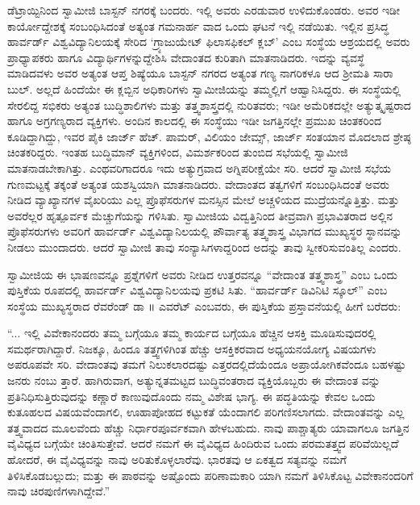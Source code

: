 ಡೆಟ್ರಾಯ್ಟಿನಿಂದ ಸ್ವಾಮೀಜಿ ಬಾಸ್ಟನ್ ನಗರಕ್ಕೆ ಬಂದರು. ಇಲ್ಲಿ ಅವರು ಎರಡುವಾರ ಉಳಿದುಕೊಂಡರು. ಅವರ ಇಡೀ ಕಾರ್ಯೋದ್ದೇಶಕ್ಕೆ ಸಂಬಂಧಿಸಿದಂತೆ ಅತ್ಯಂತ ಗಮನಾರ್ಹ ವಾದ ಒಂದು ಘಟನೆ ಇಲ್ಲಿ ನಡೆಯಿತು. ಇಲ್ಲಿನ ಪ್ರಸಿದ್ಧ ಹಾರ್ವರ್ಡ್ ವಿಶ್ವವಿದ್ಯಾನಿಲಯಕ್ಕೆ ಸೇರಿದ ‘ಗ್ರ್ಯಾಜುಯೇಟ್ ಫಿಲಾಸಫಿಕಲ್ ಕ್ಲಬ್​’ ಎಂಬ ಸಂಸ್ಥೆಯ ಆಶ್ರಯದಲ್ಲಿ ಅವರು ಪ್ರಾಧ್ಯಾಪಕರು ಹಾಗೂ ವಿದ್ಯಾರ್ಥಿಗಳನ್ನುದ್ದೇಶಿಸಿ ವೇದಾಂತದ ಕುರಿತಾಗಿ ಮಾತನಾಡಿದರು. ಇದನ್ನು ವ್ಯವಸ್ಥೆ ಮಾಡಿದವಳು ಅವರ ಅತ್ಯಂತ ಆಪ್ತ ಶಿಷ್ಯೆಯೂ ಬಾಸ್ಟನ್ ನಗರದ ಅತ್ಯಂತ ಗಣ್ಯ ನಾಗರಿಕಳೂ ಆದ ಶ್ರೀಮತಿ ಸಾರಾ ಬುಲ್. ಅಲ್ಲದೆ ಹಿಂದೆಯೇ ಈ ಕ್ಲಬ್ಬಿನ ಅಧಿಕಾರಿಗಳು ಸ್ವಾಮೀಜಿಯನ್ನು ತಮ್ಮಲ್ಲಿಗೆ ಆಹ್ವಾನಿಸಿದ್ದರು. ಈ ಸಂಸ್ಥೆಯಲ್ಲಿ ಸೇರಲಿದ್ದ ಸಭಿಕರು ಅತ್ಯಂತ ಬುದ್ಧಿಶಾಲಿಗಳು ಮತ್ತು ತತ್ತ್ವಶಾಸ್ತ್ರದಲ್ಲಿ ನುರಿತವರು; ಇಡೀ ಅಮೆರಿಕದಲ್ಲೇ ಅತ್ಯುತ್ಕೃಷ್ಟರಾದ ಹಾಗೂ ಅಗ್ರಗಣ್ಯರಾದ ವ್ಯಕ್ತಿಗಳು. ಅಂದಿನ ಕಾಲದಲ್ಲಿ ಈ ಸಂಸ್ಥೆಯು ಇಡೀ ಜಗತ್ತಿನಲ್ಲೇ ಪ್ರಮುಖ ಚಿಂತಕರಿಂದ ಕೂಡಿದ್ದಾಗಿದ್ದು, ಇವರ ಪೈಕಿ ಜಾರ್ಜ್ ಹೆಚ್. ಪಾಮರ್, ವಿಲಿಯಂ ಜೇಮ್ಸ್, ಜಾರ್ಜ್ ಸಂತಯಾನ ಮೊದಲಾದ ಶ್ರೇಷ್ಠ ಚಿಂತಕರಿದ್ದರು. ಇಂತಹ ಬುದ್ಧಿಮಾನ್ ವ್ಯಕ್ತಿಗಳಿಂದ, ವಿಮರ್ಶಕರಿಂದ ತುಂಬಿದ ಸಭೆಯಲ್ಲಿ ಸ್ವಾಮೀಜಿ ಮಾತನಾಡಬೇಕಾಗಿತ್ತು. ಎಂಥವರಿಗಾದರೂ ಇದು ಅತ್ಯುಗ್ರವಾದ ಅಗ್ನಿಪರೀಕ್ಷೆಯೇ ಸರಿ. ಆದರೆ ಸ್ವಾಮೀಜಿ ಸಭೆಯ ಗುಣಮಟ್ಟಕ್ಕೆ ತಕ್ಕಂತೆ ಅತ್ಯಂತ ಯಶಸ್ವಿಯಾಗಿ ಮಾತನಾಡಿದರು. ವೇದಾಂತದ ತತ್ವಗಳಿಗೆ ಸಂಬಂಧಿಸಿದಂತೆ ಅವರು ನೀಡಿದ ವ್ಯಾಖ್ಯಾನಗಳ ವೈಖರಿಯು ಎಲ್ಲ ಪ್ರೊಫೆಸರುಗಳ ಮನಸ್ಸಿನ ಮೇಲೆ ಅಚ್ಚಳಿಯದ ಮುದ್ರೆಯನ್ನೊತ್ತಿತ್ತು. ಮತ್ತು ಅವರೆಲ್ಲರ ಹೃತ್ಪೂರ್ವಕ ಮೆಚ್ಚುಗೆಯನ್ನು ಗಳಿಸಿತು. ಸ್ವಾಮೀಜಿಯ ವಿದ್ವತ್ತಿನಿಂದ ತೀವ್ರವಾಗಿ ಪ್ರಭಾವಿತರಾದ ಅಲ್ಲಿನ ಪ್ರೊಫೆಸರುಗಳು ಅವರಿಗೆ ಹಾರ್ವರ್ಡ್ ವಿಶ್ವವಿದ್ಯಾನಿಲಯಲ್ಲಿ ಪೌರ್ವಾತ್ಯ ತತ್ತ್ವಶಾಸ್ತ್ರ ವಿಭಾಗದ ಮುಖ್ಯಸ್ಥರ ಸ್ಥಾನವನ್ನು ನೀಡಲು ಮುಂದಾದರು. ಆದರೆ ಸ್ವಾಮೀಜಿ ತಾವು ಸಂನ್ಯಾಸಿಗಳಾದ್ದರಿಂದ ಅದನ್ನು ತಾವು ಸ್ವೀಕರಿಸುವಂತಿಲ್ಲ ಎಂದರು.

ಸ್ವಾಮೀಜಿಯ ಈ ಭಾಷಣವನ್ನೂ ಪ್ರಶ್ನೆಗಳಿಗೆ ಅವರು ನೀಡಿದ ಉತ್ತರವನ್ನೂ “ವೇದಾಂತ ತತ್ತ್ವಶಾಸ್ತ್ರ” ಎಂಬ ಒಂದು ಪುಸ್ತಿಕೆಯ ರೂಪದಲ್ಲಿ ಹಾರ್ವರ್ಡ್ ವಿಶ್ವವಿದ್ಯಾನಿಲಯವು ಪ್ರಕಟಿ ಸಿತು. “ಹಾರ್ವರ್ಡ್ ಡಿವಿನಿಟಿ ಸ್ಕೂಲ್​” ಎಂಬ ಸಂಸ್ಥೆಯ ಮುಖ್ಯಸ್ಥರಾದ ರೆವರೆಂಡ್ ಡಾ ॥ ಎವರೆಟ್ ಎಂಬವರು, ಈ ಪುಸ್ತಿಕೆಯ ಪ್ರಸ್ತಾವನೆಯಲ್ಲಿ ಹೀಗೆ ಬರೆದರು:

“... ಇಲ್ಲಿ ವಿವೇಕಾನಂದರು ತಮ್ಮ ಬಗ್ಗೆಯೂ ತಮ್ಮ ಕಾರ್ಯದ ಬಗ್ಗೆಯೂ ಹೆಚ್ಚಿನ ಆಸಕ್ತಿ ಮೂಡಿಸುವುದರಲ್ಲಿ ಸಮರ್ಥರಾಗಿದ್ದಾರೆ. ನಿಜಕ್ಕೂ, ಹಿಂದೂ ತತ್ತ್ವಗಳಿಗಿಂತ ಹೆಚ್ಚು ಆಸಕ್ತಿಕರವಾದ ಅಧ್ಯಯನಯೋಗ್ಯ ವಿಷಯಗಳು ಅಪರೂಪವೇ ಸರಿ. ವೇದಾಂತವು ತಮಗೆ ನಿಲುಕಲಾರದಷ್ಟು ಎತ್ತರದಲ್ಲಿದೆಯೆಂದೂ ಅಪ್ರಾಯೋಗಿಕವೆಂದೂ ಬಹಳಷ್ಟು ಜನರು ನಂಬು ತ್ತಾರೆ. ಹಾಗಿರುವಾಗ, ಅತ್ಯುನ್ನತಮಟ್ಟದ ಬುದ್ಧಿವಂತರಾದ ವ್ಯಕ್ತಿಯೊಬ್ಬರು ಈ ವೇದಾಂತ ವನ್ನು ಪ್ರತಿನಿಧಿಸುತ್ತಿರುವುದನ್ನು ಕಣ್ಣಾರೆ ಕಾಣುವುದೊಂದು ನಮ್ಮ ವಿಶೇಷ ಭಾಗ್ಯ. ಈ ಪದ್ಧತಿಯನ್ನು ಕೇವಲ ಒಂದು ಕುತೂಹಲದ ವಿಷಯವೆಂದಾಗಲಿ, ಊಹಾಪೋಹದ ಕಟ್ಟುಕತೆ ಯೆಂದಾಗಲಿ ಪರಿಗಣಿಸಲಾಗದು. ವೇದಾಂತವನ್ನು ಎಲ್ಲ ತತ್ತ್ವವಾದದ ಮೂಲವೆಂದು ಹೆಚ್ಚು ನಿರ್ಧಾರಪೂರ್ವಕವಾಗಿ ಹೇಳಬಹುದು. ನಾವು ಪಾಶ್ಚಾತ್ಯರು ಯಾವಾಗಲೂ ಜಗತ್ತಿನ ವೈವಿಧ್ಯದ ಬಗ್ಗೆಯೇ ಚಿಂತಿಸುತ್ತೇವೆ. ಆದರೆ ನಮಗೆ ಈ ವೈವಿಧ್ಯದ ಹಿಂದಿರುವ ಒಂದು ಪರಮತತ್ತ್ವದ ಪರಿವೆಯಿಲ್ಲದೆ ಹೋದರೆ, ಈ ವೈವಿಧ್ಯವನ್ನು ನಾವು ಅರಿತುಕೊಳ್ಳಲಾರೆವು. ಭಾರತವು ಆ ಏಕತ್ವದ ಸತ್ಯವನ್ನು ನಮಗೆ ತಿಳಿಸಿಕೊಡಬಲ್ಲುದು; ಮತ್ತು ಈ ಪಾಠವನ್ನು ಅಷ್ಟೊಂದು ಪರಿಣಾಮಕಾರಿ ಯಾಗಿ ನಮಗೆ ತಿಳಿಸಿಕೊಟ್ಟ ವಿವೇಕಾನಂದರಿಗೆ ನಾವು ಚಿರಪುಣಿಗಳಾಗಿದ್ದೇವೆ.”

